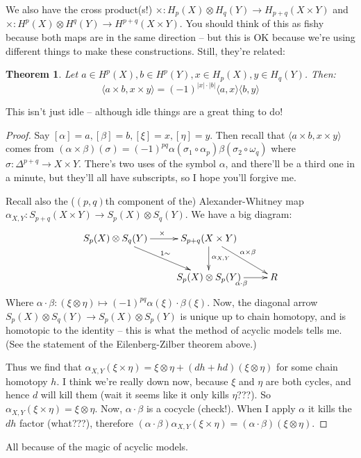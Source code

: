 \documentclass{amsart}
\theoremstyle{theorem}
\newtheorem{theorem}{Theorem}[section]
\theoremstyle{definition}
\begin{document}
We also have the cross product(s!) $\times: H_p(X)\otimes H_q(Y)\to H_{p+q}(X\times Y)$ and $\times: H^p(X)\otimes H^q(Y)\to H^{p+q}(X\times Y)$. You should think of this as fishy because both maps are in the same direction -- but this is OK because we're using different things to make these constructions. Still, they're related:
\begin{theorem}
Let $a\in H^p(X),b\in H^p(Y),x\in H_p(X), y\in H_q(Y)$. Then:
\begin{equation*}
\langle a\times b,x\times y\rangle=(-1)^{|x|\cdot |b|}\langle a,x\rangle\langle b,y\rangle
\end{equation*}
\end{theorem}
This isn't just idle -- although idle things are a great thing to do!
\begin{proof}
Say $[\alpha]=a,[\beta]=b,[\xi]=x,[\eta]=y$. Then recall that $\langle a\times b,x\times y\rangle$ comes from $(\alpha\times\beta)(\sigma)=(-1)^{pq}\alpha(\sigma_1\circ\alpha_p)\beta(\sigma_2\circ\omega_q)$ where $\sigma:\Delta^{p+q}\to X\times Y$. There's two uses of the symbol $\alpha$, and there'll be a third one in a minute, but they'll all have subscripts, so I hope you'll forgive me.

Recall also the ($(p,q)$th component of the) Alexander-Whitney map $\alpha_{X,Y}:S_{p+q}(X\times Y)\to S_p(X)\otimes S_q(Y)$. We have a big diagram:
\begin{equation*}
\xymatrix{
	S_p(X)\otimes S_q(Y)\ar[r]^{\times}\ar[dr]^{1\sim} & S_{p+q}(X\times Y)\ar[d]^{\alpha_{X,Y}}\ar[dr]^{\alpha\times\beta} & \\
	& S_p(X)\otimes S_p(Y)\ar[r]_{\alpha\cdot\beta} & R
}
\end{equation*}
Where $\alpha\cdot\beta:(\xi\otimes\eta)\mapsto(-1)^{pq}\alpha(\xi)\cdot\beta(\xi)$. Now, the diagonal arrow $S_p(X)\otimes S_q(Y)\to S_p(X)\otimes S_p(Y)$ is unique up to chain homotopy, and is homotopic to the identity -- this is what the method of acyclic models tells me. (See the statement of the Eilenberg-Zilber theorem above.)

Thus we find that $\alpha_{X,Y}(\xi\times\eta)=\xi\otimes\eta+(dh+hd)(\xi\otimes\eta)$ for some chain homotopy $h$. I think we're really down now, because $\xi$ and $\eta$ are both cycles, and hence $d$ will kill them (wait it seems like it only kills $\eta$???). So $\alpha_{X,Y}(\xi\times\eta)=\xi\otimes\eta$. Now, $\alpha\cdot\beta$ is a cocycle (check!). When I apply $\alpha$ it kills the $dh$ factor (what???), therefore $(\alpha\cdot\beta)\alpha_{X,Y}(\xi\times \eta)=(\alpha\cdot\beta)(\xi\otimes\eta)$.
\end{proof}
All because of the magic of acyclic models.
\end{document}
